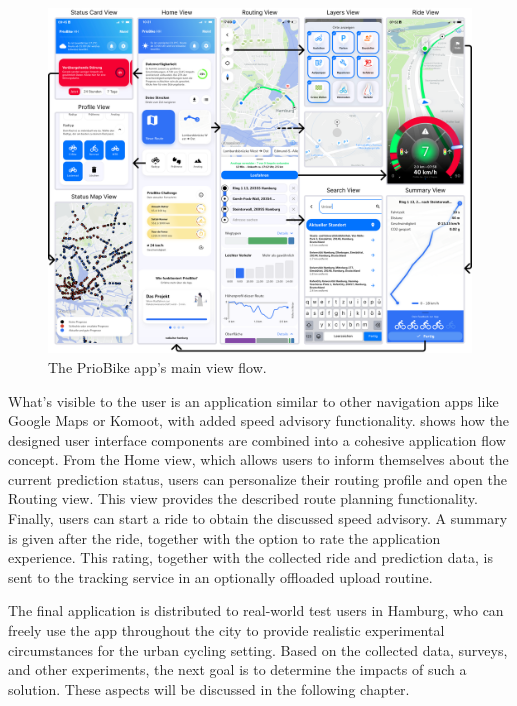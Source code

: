 \begin{figure}[htbp]
\caption{The PrioBike app's main view flow.}\label{fig:app}
\includegraphics[width=\linewidth]{images/app.png}
\end{figure}

What's visible to the user is an application similar to other navigation apps like Google Maps or Komoot, with added speed advisory functionality.  shows how the designed user interface components are combined into a cohesive application flow concept. From the Home view, which allows users to inform themselves about the current prediction status, users can personalize their routing profile and open the Routing view. This view provides the described route planning functionality. Finally, users can start a ride to obtain the discussed speed advisory. A summary is given after the ride, together with the option to rate the application experience. This rating, together with the collected ride and prediction data, is sent to the tracking service in an optionally offloaded upload routine.

The final application is distributed to real-world test users in Hamburg, who can freely use the app throughout the city to provide realistic experimental circumstances for the urban cycling setting. Based on the collected data, surveys, and other experiments, the next goal is to determine the impacts of such a solution. These aspects will be discussed in the following chapter.